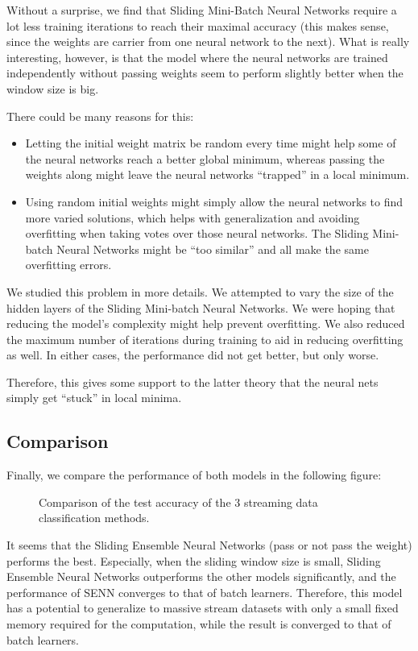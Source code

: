\documentclass[conference]{IEEEtran}
\begin{document}
Without a surprise, we find that Sliding Mini-Batch Neural Networks require a lot less training iterations to reach their maximal accuracy (this makes sense, since the weights are carrier from one neural network to the next). What is really interesting, however, is that the model where the neural networks are trained independently without passing weights seem to perform slightly better when the window size is big.

There could be many reasons for this:
\begin{itemize}
	\item Letting the initial weight matrix be random every time might help some of the neural networks reach a better global minimum, whereas passing the weights along might leave the neural networks ``trapped'' in a local minimum.
	\item Using random initial weights might simply allow the neural networks to find more varied solutions, which helps with generalization and avoiding overfitting when taking votes over those neural networks. The Sliding Mini-batch Neural Networks might be ``too similar'' and all make the same overfitting errors.
\end{itemize}

We studied this problem in more details. We attempted to vary the size of the hidden layers of the Sliding Mini-batch Neural Networks. We were hoping that reducing the model's complexity might help prevent overfitting. We also reduced the maximum number of iterations during training to aid in reducing overfitting as well. In either cases, the performance did not get better, but only worse.

Therefore, this gives some support to the latter theory that the neural nets simply get ``stuck'' in local minima.

\subsection{Comparison} 

Finally, we compare the performance of both models in the following figure:
\begin{figure}[H]
	\centering
	\caption{Comparison of the test accuracy of the 3 streaming data classification methods.}
	\label{fig:results-trees-ensemble}
\end{figure}
It seems that the Sliding Ensemble Neural Networks (pass or not pass the weight) performs the best. Especially, when the sliding window size is small, Sliding Ensemble Neural Networks outperforms  the other models significantly, and the performance of SENN converges to that of batch learners. Therefore, this model has a potential to generalize to massive stream datasets with only a small fixed memory required for the computation, while the result is converged to that of batch learners.
\end{document}
